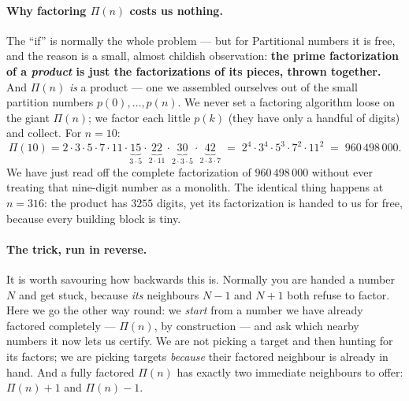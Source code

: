 \documentclass[11pt,a4paper]{article}
\newcommand{\Part}{\Pi}                 %
\begin{document}
\paragraph{Why factoring $\Part(n)$ costs us nothing.}
The ``if'' is normally the whole problem --- but for Partitional numbers it is
free, and the reason is a small, almost childish observation: \textbf{the prime
factorization of a \emph{product} is just the factorizations of its pieces,
thrown together.} And $\Part(n)$ \emph{is} a product --- one we assembled
ourselves out of the small partition numbers $p(0),\dots,p(n)$. We never set a
factoring algorithm loose on the giant $\Part(n)$; we factor each little $p(k)$
(they have only a handful of digits) and collect. For $n=10$:
\[
  \Part(10)=2\cdot3\cdot5\cdot7\cdot11\cdot
            \underbrace{15}_{3\cdot5}\cdot
            \underbrace{22}_{2\cdot11}\cdot
            \underbrace{30}_{2\cdot3\cdot5}\cdot
            \underbrace{42}_{2\cdot3\cdot7}
          \;=\; 2^{4}\cdot3^{4}\cdot5^{3}\cdot7^{2}\cdot11^{2}
          \;=\; 960\,498\,000 .
\]
We have just read off the complete factorization of $960\,498\,000$ without ever
treating that nine-digit number as a monolith. The identical thing happens at
$n=316$: the product has $3255$ digits, yet its factorization is handed to us for
free, because every building block is tiny.

\paragraph{The trick, run in reverse.}
It is worth savouring how backwards this is. Normally you are handed a number $N$
and get stuck, because \emph{its} neighbours $N-1$ and $N+1$ both refuse to
factor. Here we go the other way round: we \emph{start} from a number we have
already factored completely --- $\Part(n)$, by construction --- and ask which
nearby numbers it now lets us certify. We are not picking a target and then
hunting for its factors; we are picking targets \emph{because} their factored
neighbour is already in hand. And a fully factored $\Part(n)$ has exactly two
immediate neighbours to offer: $\Part(n)+1$ and $\Part(n)-1$.
\end{document}
